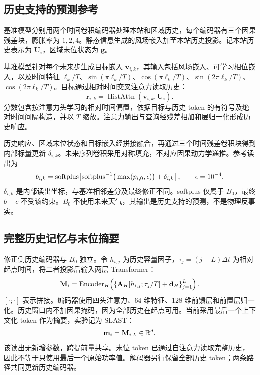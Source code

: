 \subsection{历史支持的预测参考}
\label{sec:baseline}

基准模型分别用两个时间卷积编码器处理本站和区域历史，每个编码器有三个因果残差块，膨胀率为 $1,2,4$。静态信息生成的风场嵌入加至本站历史投影。记本站历史表示为 $\mathbf U_i$，区域末位状态为 $\mathbf g$。

基准模型针对每个未来步生成目标嵌入 $\mathbf v_{i,k}$，其输入包括风场嵌入、可学习相位嵌入，以及时间特征 $\ell_k/T$、$\sin(\pi\ell_k/T)$、$\cos(\pi\ell_k/T)$、$\sin(2\pi\ell_k/T)$、$\cos(2\pi\ell_k/T)$。目标通过相对时间交叉注意力读取历史：
\begin{equation}
 \mathbf r_{i,k}=\operatorname{HistAttn}(\mathbf v_{i,k},\mathbf U_i).
\end{equation}
分数包含按注意力头学习的相对时间偏置，依据目标与历史 token 的有符号及绝对时间间隔构造，并以 $T$ 缩放。注意力输出与查询经残差相加和层归一化形成历史响应。

历史响应、区域末位状态和目标嵌入经拼接融合，再通过三个时间残差卷积块得到内部标量更新 $\delta_{i,k}$。未来序列卷积采用对称填充，不对应因果动力学递推。参考读出为
\begin{equation}
 b_{i,k}=\operatorname{softplus}\!\left[
 \operatorname{softplus}^{-1}\!\big(\max(p_{i,0},\epsilon)\big)+\delta_{i,k}\right],
 \qquad \epsilon=10^{-4}.\label{eq:baseline-readout}
\end{equation}
$\delta_{i,k}$ 是内部读出坐标，与基准相邻差分及最终修正不同。softplus 仅属于 $B_0$，最终 $b+c$ 不受该约束。$B_0$ 不使用未来天气，其输出是历史支持的预测，不是物理反事实。

\subsection{完整历史记忆与末位摘要}
\label{sec:memory}

修正侧历史编码器与 $B_0$ 独立。令 $h_{i,j}$ 为历史容量因子，$\tau_j=(j-L)\Delta t$ 为相对起点时间，将二者投影后输入两层 Transformer：
\begin{equation}
 \mathbf M_i=\operatorname{Encoder}_H\!\left(
 \left\{\mathbf A_H[h_{i,j};\tau_j/T]+\mathbf d_H\right\}_{j=1}^{L}\right).
 \label{eq:memory}
\end{equation}
$[\cdot;\cdot]$ 表示拼接。编码器使用四头注意力、$64$ 维特征、$128$ 维前馈层和前置层归一化。历史窗口内不加因果掩码，因为全部历史在起点可用。当前采用最后一个上下文化 token 作为摘要，实验记为 SLAST：
\begin{equation}
 \mathbf m_i=\mathbf M_{i,L}\in\mathbb{R}^d.\label{eq:summary}
\end{equation}
该读出无新增参数，跨提前量共享。末位 token 已通过自注意力读取完整历史，因此不等于只使用最后一个原始功率值。解码器另行保留全部历史 token；两条路径共同更新历史编码器。

